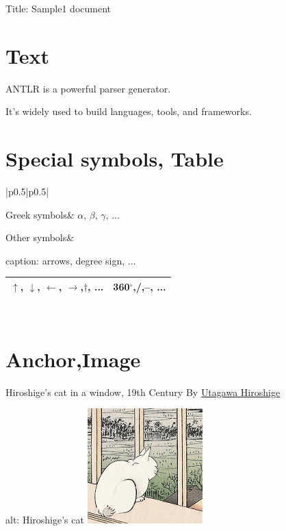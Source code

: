 \documentclass[pdflatex, a4paper, 10pt, jadriver=standard]{bxjsarticle}
\begin{document}
    
        {\Large Title: Sample1 document}\newline\newline

    

\section*{\Large Text}

	ANTLR is a powerful parser generator.\par

	It's widely used to build languages, tools, and frameworks.\par

  
\section*{\Large Special symbols, Table}

\begin{tabular}{|p{}|p{}|}\hline

		
			Greek symbols&
			$\alpha$, $\beta$, $\gamma$, ...
		\\\hline
		
			Other symbols&
			
caption: arrows, degree sign, ...\newline
\begin{tabular}{|p{}|p{}|}\hline

				
				
					$\uparrow$, $\downarrow$, $\leftarrow$, $\rightarrow$,$\dagger$, ...&
					360$^\circ$,/,--, ...
				\\\hline
			\end{tabular}

			
		\\\hline
	\end{tabular}
\newline

	
 \section*{\Large Anchor,Image}

	Hiroshige's cat in a window, 19th Century By 
		 \href{https://en.wikipedia.org/wiki/Hiroshige}{Utagawa Hiroshige}
\newline

		 alt: Hiroshige's cat\newline
\includegraphics{cat.png}
\end{document}
